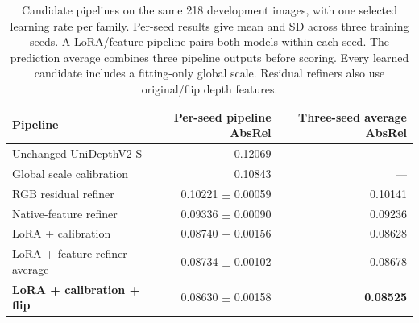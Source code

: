 \begin{table}[t]
\centering\small
\caption{Candidate pipelines on the same 218 development images, with one selected learning rate per family. Per-seed results give mean and SD across three training seeds. A LoRA/feature pipeline pairs both models within each seed. The prediction average combines three pipeline outputs before scoring. Every learned candidate includes a fitting-only global scale. Residual refiners also use original/flip depth features.}
\begin{tabular}{lrr}
\toprule
Pipeline & Per-seed pipeline AbsRel & Three-seed average AbsRel\\
\midrule
Unchanged UniDepthV2-S & 0.12069 & ---\\
Global scale calibration & 0.10843 & ---\\
RGB residual refiner & 0.10221 $\pm$ 0.00059 & 0.10141\\
Native-feature refiner & 0.09336 $\pm$ 0.00090 & 0.09236\\
LoRA + calibration & 0.08740 $\pm$ 0.00156 & 0.08628\\
LoRA + feature-refiner average & 0.08734 $\pm$ 0.00102 & 0.08678\\
\textbf{LoRA + calibration + flip} & 0.08630 $\pm$ 0.00158 & \textbf{0.08525}\\
\bottomrule
\end{tabular}
\end{table}
